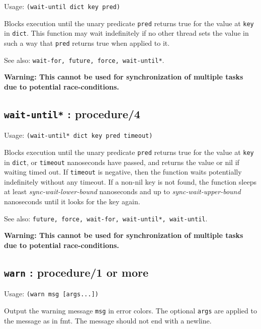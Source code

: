 \documentclass[
]{article}
\newcommand{\passthrough}[1]{#1}
\begin{document}
Usage: \passthrough{\lstinline!(wait-until dict key pred)!}

Blocks execution until the unary predicate
\passthrough{\lstinline!pred!} returns true for the value at
\passthrough{\lstinline!key!} in \passthrough{\lstinline!dict!}. This
function may wait indefinitely if no other thread sets the value in such
a way that \passthrough{\lstinline!pred!} returns true when applied to
it.

See also:
\passthrough{\lstinline!wait-for, future, force, wait-until*!}.

\textbf{Warning: This cannot be used for synchronization of multiple
tasks due to potential race-conditions.}

\hypertarget{wait-until-procedure4-1}{%
\subsection{\texorpdfstring{\texttt{wait-until*} :
procedure/4}{wait-until* : procedure/4}}\label{wait-until-procedure4-1}}

Usage: \passthrough{\lstinline!(wait-until* dict key pred timeout)!}

Blocks execution until the unary predicate
\passthrough{\lstinline!pred!} returns true for the value at
\passthrough{\lstinline!key!} in \passthrough{\lstinline!dict!}, or
\passthrough{\lstinline!timeout!} nanoseconds have passed, and returns
the value or nil if waiting timed out. If
\passthrough{\lstinline!timeout!} is negative, then the function waits
potentially indefinitely without any timeout. If a non-nil key is not
found, the function sleeps at least \emph{sync-wait-lower-bound}
nanoseconds and up to \emph{sync-wait-upper-bound} nanoseconds until it
looks for the key again.

See also:
\passthrough{\lstinline!future, force, wait-for, wait-until*, wait-until!}.

\textbf{Warning: This cannot be used for synchronization of multiple
tasks due to potential race-conditions.}

\hypertarget{warn-procedure1-or-more-1}{%
\subsection{\texorpdfstring{\texttt{warn} : procedure/1 or
more}{warn : procedure/1 or more}}\label{warn-procedure1-or-more-1}}

Usage: \passthrough{\lstinline!(warn msg [args...])!}

Output the warning message \passthrough{\lstinline!msg!} in error
colors. The optional \passthrough{\lstinline!args!} are applied to the
message as in fmt. The message should not end with a newline.
\end{document}
